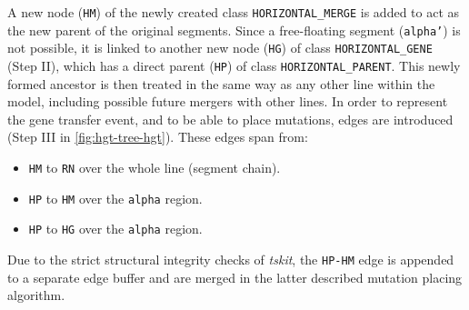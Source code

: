 A new node (\texttt{HM}) of the newly created class \texttt{HORIZONTAL_MERGE} is added to act as the new parent of the original segments.
Since a free-floating segment (\texttt{alpha'}) is not possible, it is linked to another new node (\texttt{HG}) of class \texttt{HORIZONTAL_GENE} (Step II),
which has a direct parent (\texttt{HP}) of class \texttt{HORIZONTAL_PARENT}.
This newly formed ancestor is then treated in the same way as any other line within the model, including possible future mergers with other lines.
\newpage
In order to represent the gene transfer event, and to be able to place mutations, edges are introduced (Step III  in \ref{fig:hgt-tree-hgt}).
These edges span from:
\begin{itemize}
    \item \texttt{HM} to \texttt{RN} over the whole line (segment chain).
    \item \texttt{HP} to \texttt{HM} over the \texttt{alpha} region.
    \item \texttt{HP} to \texttt{HG} over the \texttt{alpha} region.
\end{itemize}
Due to the strict structural integrity checks of \textit{tskit}, the \texttt{HP-HM} edge is appended to a separate edge buffer and are merged in the latter described mutation placing algorithm.


